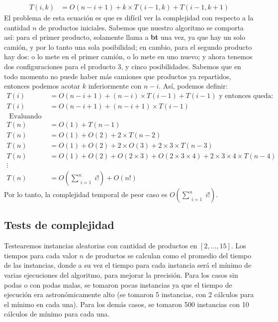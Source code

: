 \begin{align*}
T(i,k) &= O(n-i+1) + k \times T(i-1,k) + T(i-1,k+1)
\end{align*}
El problema de esta ecuación es que es difícil ver la complejidad con respecto a la cantidad $n$ de productos iniciales. Sabemos que nuestro algoritmo se comporta así: para el primer producto, solamente llama a \textbf{bt} una vez, ya que hay un solo camión, y por lo tanto una sola posibilidad; en cambio, para el segundo producto hay dos: o lo mete en el primer camión, o lo mete en uno nuevo; y ahora tenemos dos configuraciones para el producto 3, y cinco posibilidades. Sabemos que en todo momento no puede haber más camiones que productos ya repartidos, entonces podemos acotar $k$ inferiormente con $n-i$. Así, podemos definir:
\begin{align*}
T(i) &= O(n-i+1) + (n-i) \times T(i-1) + T(i-1) \text{ y entonces queda: } \\
T(i) &= O(n-i+1) + (n-i+1) \times T(i-1) \\
\text{ Evaluando en n: } \\
T(n) &= O(1) + T(n-1) \\
T(n) &= O(1) + O(2) + 2 \times T(n-2) \\
T(n) &= O(1) + O(2) + 2 \times O(3) + 2 \times 3 \times T(n-3) \\
T(n) &= O(1) + O(2) + O(2 \times 3) + O(2 \times 3 \times 4) + 2 \times 3 \times 4 \times T(n-4) \\
\vdots \\
T(n) &= O\left(\sum\limits_{\substack{i = 1}}^n i!\right) + O(n!)
\end{align*}
Por lo tanto, la complejidad temporal de peor caso es $O\left(\sum\limits_{\substack{i = 1}}^n i!\right)$.

\subsection{Tests de complejidad}
Testearemos instancias aleatorias con cantidad de productos en $[2,...,15]$. Los tiempos para cada valor $n$ de productos se calculan como el promedio del tiempo de las instancias, donde a su vez el tiempo para cada instancia será el mínimo de varias ejecuciones del algoritmo, para mejorar la precisión. Para los casos sin podas o con podas malas, se tomaron pocas instancias ya que el tiempo de ejecución era astronómicamente alto (se tomaron 5 instancias, con 2 cálculos para el mínimo en cada una). Para los demás casos, se tomaron 500 instancias con 10 cálculos de mínimo para cada una.


